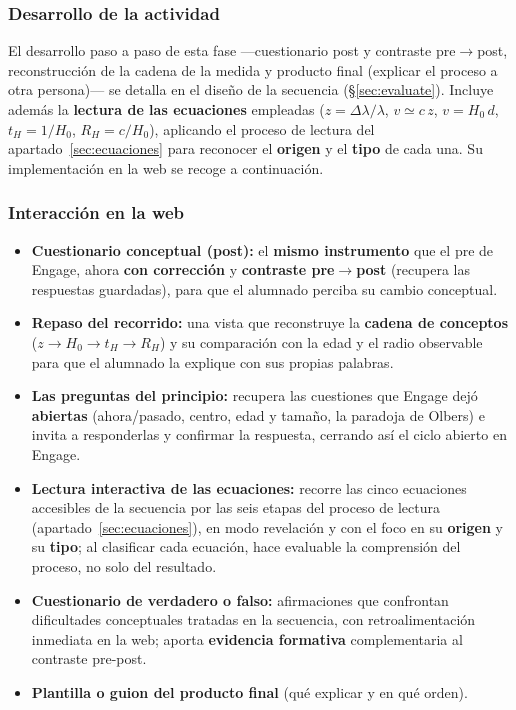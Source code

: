 \subsubsection*{Desarrollo de la actividad}

El desarrollo paso a paso de esta fase ---cuestionario post y contraste pre$\rightarrow$post, reconstrucción de la cadena de la medida y producto final (explicar el proceso a otra persona)--- se detalla en el diseño de la secuencia (§\ref{sec:evaluate}). Incluye además la \textbf{lectura de las ecuaciones} empleadas ($z=\Delta\lambda/\lambda$, $v\simeq c\,z$, $v=H_{0}\,d$, $t_H=1/H_{0}$, $R_H=c/H_{0}$), aplicando el proceso de lectura del apartado~\ref{sec:ecuaciones} para reconocer el \textbf{origen} y el \textbf{tipo} de cada una. Su implementación en la web se recoge a continuación.

\subsubsection*{Interacción en la web}

\begin{itemize}
\item \textbf{Cuestionario conceptual (post):} el \textbf{mismo instrumento} que el pre de Engage, ahora \textbf{con corrección} y \textbf{contraste pre$\rightarrow$post} (recupera las respuestas guardadas), para que el alumnado perciba su cambio conceptual.
\item \textbf{Repaso del recorrido:} una vista que reconstruye la \textbf{cadena de conceptos} ($z \rightarrow H_{0} \rightarrow t_H \rightarrow R_H$) y su comparación con la edad y el radio observable para que el alumnado la explique con sus propias palabras.
\item \textbf{Las preguntas del principio:} recupera las cuestiones que Engage dejó \textbf{abiertas} (ahora/pasado, centro, edad y tamaño, la paradoja de Olbers) e invita a responderlas y confirmar la respuesta, cerrando así el ciclo abierto en Engage.
\item \textbf{Lectura interactiva de las ecuaciones:} recorre las cinco ecuaciones accesibles de la secuencia por las seis etapas del proceso de lectura (apartado~\ref{sec:ecuaciones}), en modo revelación y con el foco en su \textbf{origen} y su \textbf{tipo}; al clasificar cada ecuación, hace evaluable la comprensión del proceso, no solo del resultado.
\item \textbf{Cuestionario de verdadero o falso:} afirmaciones que confrontan dificultades conceptuales tratadas en la secuencia, con retroalimentación inmediata en la web; aporta \textbf{evidencia formativa} complementaria al contraste pre-post.
\item \textbf{Plantilla o guion del producto final} (qué explicar y en qué orden).
\end{itemize}

